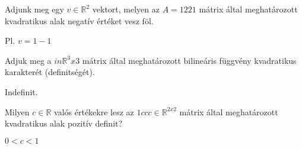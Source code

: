 \begin{frame}
  \begin{tcolorbox}[title={12/2. {\symrook}}]
     Adjunk meg egy $v \in \mathbb{R}^2$ vektort, melyen az $A =  1 2 2 1$  mátrix által meghatározott kvadratikus alak negatív értéket vesz föl.


  \tcblower

    \mmedskip 
    
    Pl. $v =   1 -1 $
  \end{tcolorbox}
\end{frame}


\begin{frame}
  \begin{tcolorbox}[title={12/3. {\symrook}}]
     Adjuk meg a   $in \mathbb{R}^3x$3 mátrix által meghatározott bilineáris függvény kvadratikus karakterét (definitségét).


  \tcblower

    \mmedskip 
    
    Indefinit.
  \end{tcolorbox}
\end{frame}


\begin{frame}
  \begin{tcolorbox}[title={12/4. {\symknight}}]
     Milyen $c \in \mathbb{R}$ valós értékekre lesz az $1 c c c \in \mathbb{R}^{2 x 2}$ mátrix által meghatározott kvadratikus alak pozitív definit?

  \tcblower

    \mmedskip 
    
    $0 < c < 1$
  \end{tcolorbox}
\end{frame}


